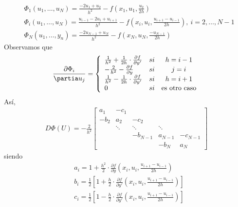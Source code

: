 \begin{align*}
    &\Phi_1(u_1,\ldots,u_N) = \frac{-2u_1 + u_2}{h^2} - f\left( x_1,u_1, \frac{u_2}{2h} \right) \\
    & \Phi_i(u_1,\ldots,u_N) = \frac{u_{i-1} - 2u_i + u_{i+1}}{h^2} - f\left(x_i, u_i, \frac{u_{i+1} -u_{i-1}}{2h} \right), \ i = 2,\ldots,N-1 \\
    & \Phi_N(u_1,\ldots,y_n) = \frac{-2u_{N-1} + u_N}{h^2} - f\left( x_N,u_N, \frac{-u_{N-1  }}{2h} \right)
\end{align*}
Observamos que
\begin{align*}
    \frac{\partial \Phi_i}{\partia u_j} = \left\{ \begin{array}{lcc}
             \frac{1}{h^2} + \frac{1}{2h} \cdot \frac{\partial f}{\partial y'} & si & h = i-1 \\
             -\frac{2}{h^2} - \frac{\partial f}{\partial y} & si & j = i \\
             \frac{1}{h^2} - \frac{1}{2h} \cdot \frac{\partial f}{\partial y'} & si & h = i+1 \\
             0 & si & \text{es otro caso}
             \end{array}
   \right.
\end{align*}
Así,
\begin{align*}
    D\Phi(U) = -\frac{2}{h^2} \begin{bmatrix}
a_1 & -c_1 &  &  & \\
-b_2 & a_2 & -c_2 &  & \\
 & \ddots & \ddots & \ddots & \\
 &  & -b_{N-1} & a_{N-1} & -c_{N-1} \\
 &  &  & -b_N & a_N
\end{bmatrix}
\end{align*}
siendo
\begin{align*}
    & a_i = 1 + \frac{h^2}{2} \cdot \frac{\partial f}{\partial y} \left(x_i,u_i, \frac{u_{i+1} - u_{i-1}}{2h} \right) \\
    & b_i = \frac{1}{2} \left[ 1 + \frac{h}{2} \cdot \frac{\partial f}{\partial y'} \left(x_i,u_i, \frac{u_{i+1} - u_{i-1}}{2h} \right) \right] \\
    & c_i = \frac{1}{2} \left[ 1 - \frac{h}{2} \cdot \frac{\partial f}{\partial y'} \left(x_i,u_i, \frac{u_{i+1} - u_{i-1}}{2h} \right) \right]
\end{align*}